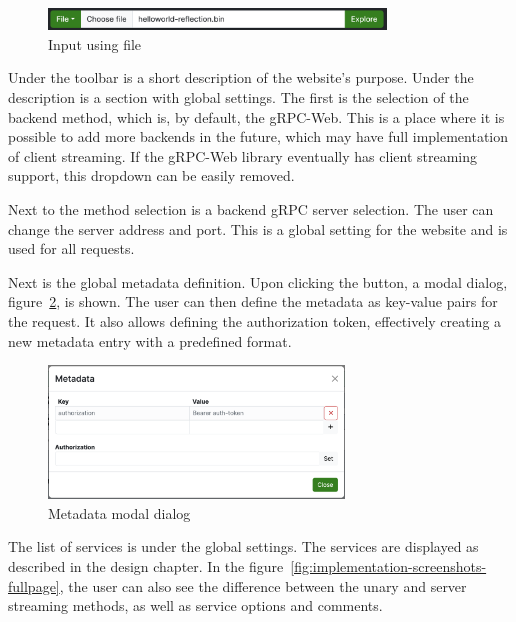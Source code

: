 \begin{figure}[!htb]
    \centering
    \captionsetup{justification=centering}
    \includegraphics[width=0.8\textwidth]{images/implementation/screenshots/reflection-input}
    \caption{Input using file}
    \label{fig:implementation-screenshots-reflection-input}
\end{figure}

Under the toolbar is a short description of the website's purpose.
Under the description is a section with global settings.
The first is the selection of the backend method, which is, by default, the gRPC-Web.
This is a place where it is possible to add more backends in the future, which may have full implementation of client streaming.
If the gRPC-Web library eventually has client streaming support, this dropdown can be easily removed.

Next to the method selection is a backend gRPC server selection.
The user can change the server address and port.
This is a global setting for the website and is used for all requests.

Next is the global metadata definition.
Upon clicking the button, a modal dialog, figure~\ref{fig:implementation-screenshots-metadata-modal}, is shown.
The user can then define the metadata as key-value pairs for the request.
It also allows defining the authorization token, effectively creating a new metadata entry with a predefined format.

\begin{figure}[!htb]
    \centering
    \captionsetup{justification=centering}
    \includegraphics[width=0.7\textwidth]{images/implementation/screenshots/metadata-modal}
    \caption{Metadata modal dialog}
    \label{fig:implementation-screenshots-metadata-modal}
\end{figure}

The list of services is under the global settings.
The services are displayed as described in the design chapter.
In the figure~\ref{fig:implementation-screenshots-fullpage}, the user can also see the difference between the unary and server streaming methods, as well as service options and comments.

